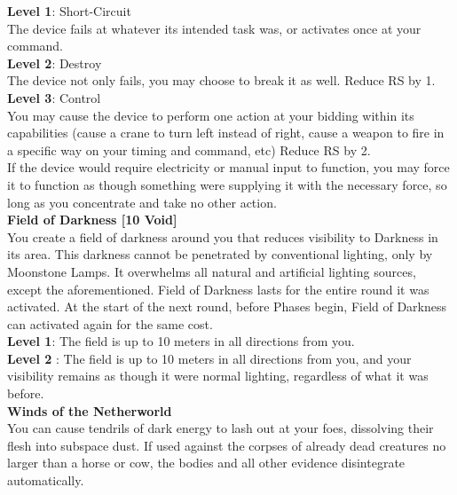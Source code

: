 \documentclass[a4paper, twocolumn, openany]{book}
\newlength{\indentlen}
\newcommand{\tabto}[1]{\setlength{\leftskip}{#1\indentlen}}
\begin{document}
{	\tabto{1}
	{\bfseries Level 1}: Short-Circuit\\
	The device fails at whatever its intended task was, or activates once at your command.\\

		\tabto{2}
		{\bfseries Level 2}: Destroy\\
		The device not only fails, you may choose to break it as well. Reduce RS by 1.\\

			\tabto{3}
			{\bfseries Level 3}: Control\\
			You may cause the device to perform one action at your bidding within its
			capabilities (cause a crane to turn left instead of right, cause a weapon to
			fire in a specific way on your timing and command, etc) Reduce RS by 2.\\
			If the device would require electricity or manual input to function, you may
			force it to function as though something were supplying it with the
			necessary force, so long as you concentrate and take no other action.\\

\tabto{0}
{\bfseries\large Field of Darkness [10 Void]\\}
You create a field of darkness around you that reduces visibility to Darkness in its area. This
darkness cannot be penetrated by conventional lighting, only by Moonstone Lamps. It
overwhelms all natural and artificial lighting sources, except the aforementioned. Field of
Darkness lasts for the entire round it was activated. At the start of the next round, before
Phases begin, Field of Darkness can activated again for the same cost.\\

	\tabto{1}
	{\bfseries Level 1}: The field is up to 10 meters in all directions from you.\\

		\tabto{2}
		{\bfseries Level 2} : The field is up to 10 meters in all directions from you, and your visibility
		remains as though it were normal lighting, regardless of what it was before.\\

\tabto{0}
{\bfseries\large Winds of the Netherworld\\}
You can cause tendrils of dark energy to lash out at your foes, dissolving their flesh into
subspace dust. If used against the corpses of already dead creatures no larger than a horse or
cow, the bodies and all other evidence disintegrate automatically.\\

}
\end{document}
